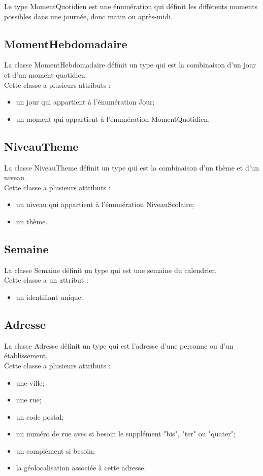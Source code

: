 \documentclass[asi, sansVersion]{picInsa}
\begin{document}
Le type MomentQuotidien est une énumération qui définit les différents moments possibles dans une journée, donc matin ou après-midi.

\subsection*{MomentHebdomadaire}

La classe MomentHebdomadaire définit un type qui est la combinaison d'un jour et d'un moment quotidien.\\
Cette classe a plusieurs attributs :
\begin{itemize}
\item un jour qui appartient à l'énumération Jour;
\item un moment qui appartient à l'énumération MomentQuotidien.
\end{itemize}

\subsection*{NiveauTheme}

La classe NiveauTheme définit un type qui est la combinaison d'un thème et d'un niveau.\\
Cette classe a plusieurs attributs : 
\begin{itemize}
\item un niveau qui appartient à l'énumération NiveauScolaire;
\item un thème.
\end{itemize}

\subsection*{Semaine}

La classe Semaine définit un type qui est une semaine du calendrier.\\
Cette classe a un attribut : 
\begin{itemize}
\item un identifiant unique.
\end{itemize}

\subsection*{Adresse}

La classe Adresse définit un type qui est l'adresse d'une personne ou d'un établissement.\\
Cette classe a plusieurs attributs : 
\begin{itemize}
\item une ville;
\item une rue;
\item un code postal;
\item un numéro de rue avec si besoin le supplément "bis", "ter" ou "quater";
\item un complément si besoin;
\item la géolocalisation associée à cette adresse.
\end{itemize}
\end{document}
